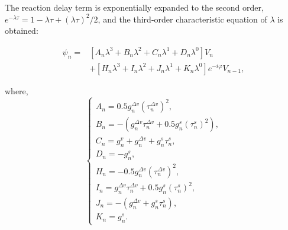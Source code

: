 \documentclass[journal]{IEEEtran}
\begin{document}
The reaction delay term is exponentially expanded to the second order, $e^{-\lambda \tau}=1-\lambda \tau+ ({\lambda \tau})^2/2$, and the third-order characteristic equation of $\lambda$ is obtained:
\begin{small}
  \begin{equation}
    \begin{aligned}
      \psi_{n}\!= & \!\left[A_{n} \lambda^{3}\!+\!B_{n} \lambda^{2}\!+\!C_{n} \lambda^{1}\!+\!D_{n} \lambda^{0}\right] V_{n}                   \\
                  & +\!\left[H_{n} \lambda^{3}\!+\!I_{n} \lambda^{2}\!+\!J_{n} \lambda^{1}\!+\!K_{n} \lambda^{0}\right] e^{-i \varphi}V_{n-1},
      \label{Eq12}
    \end{aligned}
  \end{equation}
\end{small}
where,
\begin{equation}
  \left\{\begin{array}{l}
    A_{n}=0.5 g_{n}^{\Delta v}\left(\tau_{n}^{\Delta v}\right)^{2},                                      \\
    B_{n}=-\left(g_{n}^{\Delta v} \tau_{n}^{\Delta v}+0.5 g_{n}^{s}\left(\tau_{n}^{s}\right)^{2}\right), \\
    C_{n}=g_{n}^{v}+g_{n}^{\Delta v}+g_{n}^{s} \tau_{n}^{s},                                             \\
    D_{n}=-g_{n}^{s},                                                                                    \\
    H_{n}=-0.5 g_{n}^{\Delta v}\left(\tau_{n}^{\Delta v}\right)^{2},                                     \\
    I_{n}=g_{n}^{\Delta v} \tau_{n}^{\Delta v}+0.5g_{n}^{s}\left(\tau_{n}^{s}\right)^{2},                \\
    J_{n}=-\left(g_{n}^{\Delta v}+g_{n}^{s} \tau_{n}^{s}\right),                                         \\
    K_{n}=g_{n}^{s}.
  \end{array}\right.
  \label{Eq13}
\end{equation}
\end{document}
